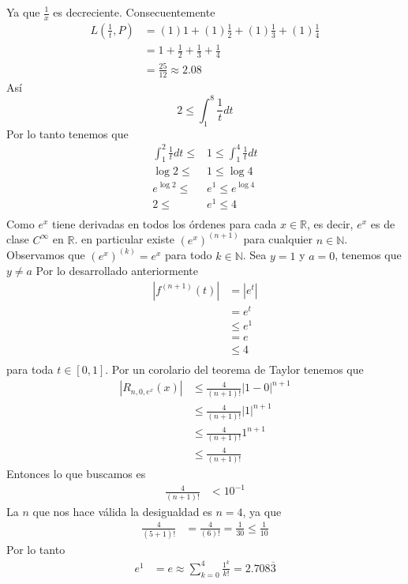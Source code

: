\documentclass[a4paper]{article}
\begin{document}
Ya que \(\frac{1}{x}\) es decreciente. Consecuentemente
\begin{align*}
    L\left(\frac{1}{t}, P\right) &= (1)1 + (1)\frac{1}{2} + (1)\frac{1}{3} + (1)\frac{1}{4} \\
    &= 1 + \frac{1}{2} + \frac{1}{3} + \frac{1}{4} \\
    &= \frac{25}{12} \approx 2{.}08
\end{align*}
Así 
\[
    2 \leq \int_{1}^{8} \frac{1}{t} dt  
\]
Por lo tanto tenemos que 
\begin{align*}
    \int_{1}^{2} \frac{1}{t} dt \leq &1 \leq \int_{1}^{4} \frac{1}{t} dt \\
    \log{2} \leq &1 \leq \log{4} \\
    e^{\log{2}} \leq &e^{1} \leq e^{\log{4}} \\
    2 \leq &e^{1} \leq 4  \\
\end{align*}
Como \(e^{x}\) tiene derivadas en todos los órdenes para cada 
\(x \in \mathbb{R}\), es decir, \(e^{x}\) es de clase \(C^{\infty}\) en \(\mathbb{R}\).
en particular existe \(\left(e^{x}\right)^{(n + 1)}\) para cualquier \(n \in \mathbb{N}\).
Observamos que \(\left(e^{x}\right)^{(k)} = e^{x}\) para todo \(k \in \mathbb{N}\).
\newline 
Sea \(y = 1\) y \(a = 0\), tenemos que \(y \neq a\)
Por lo desarrollado anteriormente
\begin{align*}
    |f^{(n + 1)}(t)| &= |e^{t}| \\
                     &= e^{t} \\
                     &\leq e^{1} \\
                     &= e \\
                     &\leq 4 \\
\end{align*}
para toda \(t \in [0, 1]\).
Por un corolario del teorema de Taylor tenemos que 
\begin{align*}
    |R_{n, 0, e^{x}}(x)| &\leq \frac{4}{(n + 1)!}|1 - 0|^{n+1} \\
                         &\leq \frac{4}{(n + 1)!}|1|^{n+1} \\
                         &\leq \frac{4}{(n + 1)!}1^{n+1} \\
                         &\leq \frac{4}{(n + 1)!}
\end{align*}
Entonces lo que buscamos es
\begin{align*}
    \frac{4}{(n + 1)!} &< 10^{-1}
\end{align*}
La \(n\) que nos hace válida la desigualdad es \(n = 4\), ya que
\begin{align*}
    \frac{4}{(5 + 1)!} &= \frac{4}{(6)!} = \frac{1}{30} \leq \frac{1}{10}
\end{align*}
Por lo tanto
\begin{align*}
    e^{1} &= e \approx \sum_{k = 0}^{4} \frac{1^k}{k!} = 2{.}708\overline{3}
\end{align*}
\end{document}
